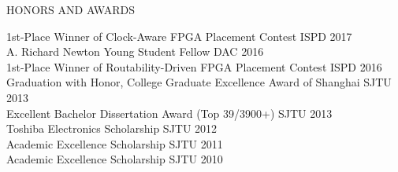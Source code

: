 \documentclass{resume} %
\begin{document}
\begin{rSection}{HONORS AND AWARDS}

1st-Place Winner of Clock-Aware FPGA Placement Contest               \hfill ISPD \hspace{0.1\textwidth} 2017 \\
A. Richard Newton Young Student Fellow                               \hfill DAC  \hspace{0.1\textwidth} 2016 \\
1st-Place Winner of Routability-Driven FPGA Placement Contest        \hfill ISPD \hspace{0.1\textwidth} 2016 \\
Graduation with Honor, College Graduate Excellence Award of Shanghai \hfill SJTU \hspace{0.1\textwidth} 2013 \\
Excellent Bachelor Dissertation Award (Top 39/3900+)                 \hfill SJTU \hspace{0.1\textwidth} 2013 \\
Toshiba Electronics Scholarship                                      \hfill SJTU \hspace{0.1\textwidth} 2012 \\
Academic Excellence Scholarship                                      \hfill SJTU \hspace{0.1\textwidth} 2011 \\
Academic Excellence Scholarship                                      \hfill SJTU \hspace{0.1\textwidth} 2010 \\

\end{rSection}

\end{document}
